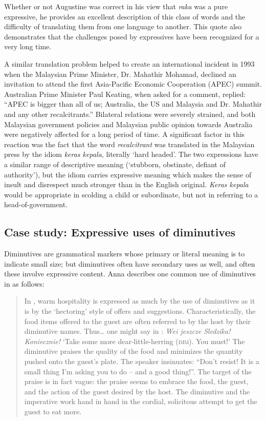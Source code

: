 Whether or not Augustine was correct in his view that \textit{raka} was a pure expressive, he provides an excellent description of this class of words and the difficulty of translating them from one language to another. This quote also demonstrates that the challenges posed by expressives have been recognized for a very long time.



A similar translation problem helped to create an international incident in 1993 when the Malaysian Prime Minister, Dr. Mahathir Mohamad, declined an invitation to attend the first Asia-Pacific Economic Cooperation (APEC) summit. {Australian} Prime Minister Paul Keating, when asked for a comment, replied: “APEC is bigger than all of us; Australia, the US and Malaysia and Dr. Mahathir and any other recalcitrants.” Bilateral relations were severely strained, and both Malaysian government policies and Malaysian public opinion towards Australia were negatively affected for a long period of time. A significant factor in this reaction was the fact that the word \textit{recalcitrant} was translated in the Malaysian press by the  idiom \textit{keras kepala}, literally ‘hard headed’. The two expressions have a similar range of descriptive meaning (‘stubborn, obstinate, defiant of authority’), but the  idiom carries expressive meaning which makes the sense of insult and disrespect much stronger than in the English original. \textit{Keras kepala} would be appropriate in scolding a child or subordinate, but not in referring to a head-of-government.


\subsection{Case study: Expressive uses of diminutives}\label{sec:2.6.6}

Diminutives are grammatical markers whose primary or literal meaning is to indicate small size; but diminutives often have secondary uses as well, and often these involve expressive content. Anna \citet{Wierzbicka1985} describes one common use of diminutives in  as follows:\largerpage


\begin{quote}
In , warm hospitality is expressed as much by the use of diminutives as it is by the ‘hectoring’ style of offers and suggestions. Characteristically, the food items offered to the guest are often referred to by the host by their diminutive names. Thus… one might say in : \textit{Wei jeszcze Sledzika! Koniecznie!} ‘Take some more dear-little-herring (\textsc{dim}). You must!’ The diminutive praises the quality of the food and minimizes the quantity pushed onto the guest’s plate. The speaker insinuates: “Don’t resist! It is a small thing I’m asking you to do – and a good thing!”. The target of the praise is in fact vague: the praise seems to embrace the food, the guest, and the action of the guest desired by the host. The diminutive and the imperative work hand in hand in the cordial, solicitous attempt to get the guest to eat more.
\end{quote}


